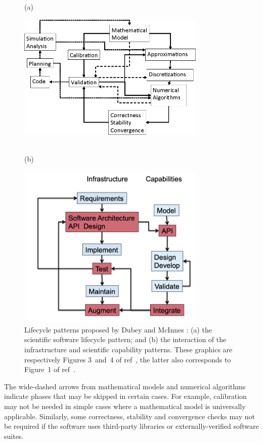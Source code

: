 \begin{figure}[thp]
(a)\centerline{\includegraphics[width=0.8\textwidth]{../png/DubeyFig3.png}}
\\(b)\centerline{\includegraphics[width=0.8\textwidth]{../png/wkflow.png}}
	\caption{Lifecycle patterns proposed by Dubey and McInnes \cite{Du16Idea}: 
	(a) the scientific software lifecycle pattern; and
	(b) the interaction of the infrastructure and scientific capability patterns.
	These graphics are respectively Figures 3~and~4 of ref~,
        the latter also corresponds to Figure~1 of ref~. \label{fig:DubeyFigs}}
\end{figure}

The wide-dashed arrows from mathematical models and numerical algorithms
indicate phases that may be skipped in certain cases.
For example, calibration may not be needed in simple cases where a
mathematical model is universally applicable.
Similarly, some correctness, stability and convergence checks may not be
required if the software uses third-party libraries or externally-verified
software suites.

